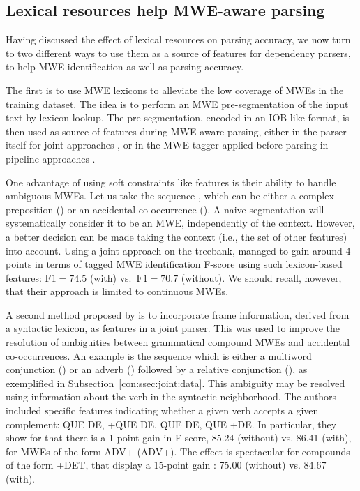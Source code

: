 \documentclass[output=paper]{langsci/langscibook}
\begin{document}
\subsection{Lexical resources help MWE-aware parsing}
\label{con:ssec:lex-help-mwe}

Having discussed the effect of lexical resources on parsing accuracy, we now turn to two different ways to use them as a source of features for dependency parsers, to help MWE identification as well as parsing accuracy. 

The first is to use MWE lexicons to alleviate the low coverage of MWEs in the training dataset. The idea is to perform an MWE pre-segmentation of the input text by lexicon lookup. The pre-segmentation, encoded in an IOB-like format, is then used as source of features during MWE-aware parsing, either in the parser itself for joint approaches \citep{candito2014strategies}, or in the MWE tagger applied before parsing in pipeline approaches \citep{constant12acl,constant13mwe}.  

One advantage of using soft constraints like features is their ability to handle ambiguous MWEs.
Let us take the sequence , which can be either a complex preposition () or an accidental co-occurrence (). A naive segmentation will systematically consider it to be an MWE, independently of the context. However, a better decision can be made taking the context (i.e., the set of other features) into account. Using a joint approach on the  treebank, \citet{candito2014strategies} managed to gain around 4 points in terms of tagged MWE identification F-score using such lexicon-based features: $\text{F}1=74.5$ (with) vs.\ $\text{F}1=70.7$ (without). We should recall, however, that their approach is limited to continuous MWEs.


A second method proposed by \citet{nasretal15} is to incorporate  frame information, derived from a syntactic lexicon, as features in a joint parser. This was used to improve the resolution of ambiguities between grammatical compound MWEs and accidental co-occurrences.
An example is the  sequence  which is either a multiword conjunction () or  an adverb () followed by a relative conjunction (), as exemplified in Subsection~\ref{con:ssec:joint:data}. This ambiguity may be resolved using information about the verb in the syntactic neighborhood. The authors included specific features indicating whether a given verb accepts a given complement:  \textminus QUE \textminus DE,  +QUE \textminus DE,  \textminus QUE \textminus DE,  \textminus QUE +DE. 
In particular, they show for  that there is a 1-point gain in F-score, 85.24 (without) vs. 86.41 (with), for MWEs of the form ADV+ (ADV+). The effect is spectacular for compounds of the form +DET, that display a 15-point gain : 75.00 (without) vs. 84.67 (with).
\end{document}
